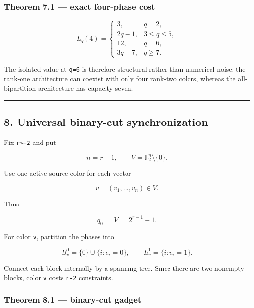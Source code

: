 \hypertarget{theorem-7.1-exact-four-phase-cost}{%
\subsubsection{Theorem 7.1 --- exact four-phase
cost}\label{theorem-7.1-exact-four-phase-cost}}

\[
\boxed{
L_q(4)=
\begin{cases}
3,&q=2,\\
2q-1,&3\le q\le5,\\
12,&q=6,\\
3q-7,&q\ge7.
\end{cases}
}
\tag{31}
\]

The isolated value at \texttt{q=6} is therefore structural rather than
numerical noise: the rank-one architecture can coexist with only four
rank-two colors, whereas the all-bipartition architecture has capacity
seven.

\begin{center}\rule{0.5\linewidth}{0.5pt}\end{center}

\hypertarget{universal-binary-cut-synchronization}{%
\subsection{8. Universal binary-cut
synchronization}\label{universal-binary-cut-synchronization}}

Fix \texttt{r\textgreater{}=2} and put

\[
n=r-1,
\qquad
V=\mathbb F_2^n\setminus\{0\}.
\tag{32}
\]

Use one active source color for each vector

\[
v=(v_1,\ldots,v_n)\in V.
\]

Thus

\[
q_0=|V|=2^{r-1}-1.
\tag{33}
\]

For color \texttt{v}, partition the phases into

\[
B_v^0=\{0\}\cup\{i:v_i=0\},
\qquad
B_v^1=\{i:v_i=1\}.
\tag{34}
\]

Connect each block internally by a spanning tree. Since there are two
nonempty blocks, color \texttt{v} costs \texttt{r-2} constraints.

\hypertarget{theorem-8.1-binary-cut-gadget}{%
\subsubsection{Theorem 8.1 --- binary-cut
gadget}\label{theorem-8.1-binary-cut-gadget}}

